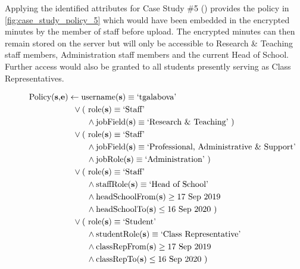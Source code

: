 Applying the identified attributes for Case Study \#5 () provides the policy in \cref{fig:case_study_policy_5} which would have been embedded in the encrypted minutes by the member of staff before upload. The encrypted minutes can then remain stored on the server but will only be accessible to Research \& Teaching staff members, Administration staff members and the current Head of School. Further access would also be granted to all students presently serving as Class Representatives.

\begin{figure}[ht]
  \centering
\begin{align*}
  \text{Policy(\textbf{s},\textbf{e})}
  &
    \leftarrow
    \text{username(\textbf{s})} \equiv \text{`tgalabova'}
  \\
  &
    \phantom{::}\vee
    \text{( role(\textbf{s})} \equiv \text{`Staff'}
  \\
  &
    \phantom{::::::::}\wedge
    \text{jobField(\textbf{s})} \equiv \text{`Research \& Teaching' )}
  \\
  &
    \phantom{::}\vee
    \text{( role(\textbf{s})} \equiv \text{`Staff'}
  \\
  &
    \phantom{::::::::}\wedge
    \text{jobField(\textbf{s})} \equiv \text{`Professional, Administrative \& Support'}
  \\
  &
    \phantom{::::::::}\wedge
    \text{jobRole(\textbf{s})} \equiv \text{`Administration' )}
  \\
  &
    \phantom{::}\vee
    \text{( role(\textbf{s})} \equiv \text{`Staff'}
  \\
  &
    \phantom{::::::::}\wedge
    \text{staffRole(\textbf{s})} \equiv \text{`Head of School'}
  \\
  &
    \phantom{::::::::}\wedge
    \text{headSchoolFrom(\textbf{s})} \geq \text{17 Sep 2019}
  \\
  &
    \phantom{::::::::}\wedge
    \text{headSchoolTo(\textbf{s})} \leq \text{16 Sep 2020 )}
  \\
  &
    \phantom{::}\vee
    \text{( role(\textbf{s})} \equiv \text{`Student'}
  \\
  &
    \phantom{::::::::}\wedge
    \text{studentRole(\textbf{s})} \equiv \text{`Class Representative'}
  \\
  &
    \phantom{::::::::}\wedge
    \text{classRepFrom(\textbf{s})} \geq \text{17 Sep 2019}
  \\
  &
    \phantom{::::::::}\wedge
    \text{classRepTo(\textbf{s})} \leq \text{16 Sep 2020 )}

\end{align*}
\end{figure}
